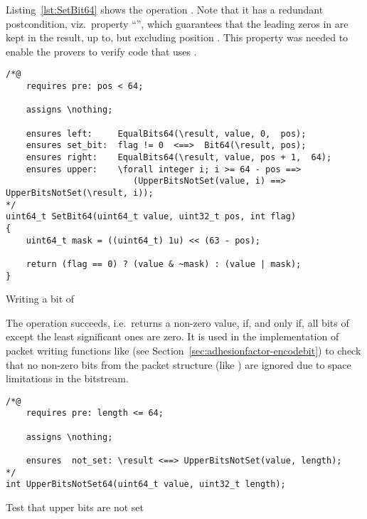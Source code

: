 \FloatBarrier

Listing~\ref{lst:SetBit64} shows the operation .
%
Note that it has a redundant postcondition, viz.\ property
``'', which guarantees that the leading zeros in
 are kept in the result, up to, but excluding
position .
%
This property was needed to enable the provers to verify code that uses
.




\begin{listing}[hbt]
\begin{minipage}{0.99\textwidth}
\begin{lstlisting}[style=acsl-block]
/*@
    requires pre: pos < 64;

    assigns \nothing;

    ensures left:     EqualBits64(\result, value, 0,  pos);
    ensures set_bit:  flag != 0  <==>  Bit64(\result, pos);
    ensures right:    EqualBits64(\result, value, pos + 1,  64);
    ensures upper:    \forall integer i; i >= 64 - pos ==>
                         (UpperBitsNotSet(value, i) ==> UpperBitsNotSet(\result, i));
*/
uint64_t SetBit64(uint64_t value, uint32_t pos, int flag)
{
    uint64_t mask = ((uint64_t) 1u) << (63 - pos);

    return (flag == 0) ? (value & ~mask) : (value | mask);
}
\end{lstlisting}
\end{minipage}
\caption{\label{lst:SetBit64}Writing a bit of }
\end{listing}

\FloatBarrier

The operation  succeeds,
i.e.\ returns a
non-zero value, if, and only if, all bits of  except
the least significant
 ones are zero.
%
It is used in the implementation of packet writing functions like
(see Section~\ref{sec:adhesionfactor-encodebit})
to check that no non-zero bits from the packet structure (like
) are ignored due to space
limitations in the bitstream.

\begin{listing}[hbt]
\begin{minipage}{0.99\textwidth}
\begin{lstlisting}[style=acsl-block]
/*@
    requires pre: length <= 64;

    assigns \nothing;

    ensures  not_set: \result <==> UpperBitsNotSet(value, length);
*/
int UpperBitsNotSet64(uint64_t value, uint32_t length);
\end{lstlisting}
\end{minipage}
\caption{\label{lst:UpperBitsNotSet64}Test that upper bits are not set}
\end{listing}

